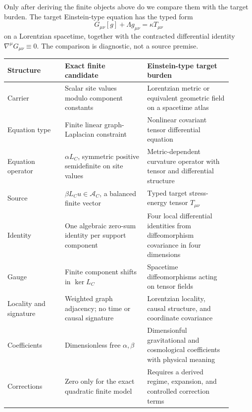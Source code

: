 \documentclass[11pt]{article}
\newcommand{\Aspace}{\mathcal A_C}
\begin{document}
Only after deriving the finite objects above do we compare them with the
target burden.  The target Einstein-type equation has the typed form
\[
 G_{\mu\nu}[g]+\Lambda g_{\mu\nu}=\kappa T_{\mu\nu}
\]
on a Lorentzian spacetime, together with the contracted differential
identity \(\nabla^\mu G_{\mu\nu}\equiv0\).  The comparison is diagnostic,
not a source premise.

\begin{longtable}{p{0.23\linewidth}p{0.33\linewidth}p{0.34\linewidth}}
\toprule
Structure & Exact finite candidate & Einstein-type target burden\\
\midrule
Carrier &
Scalar site values modulo component constants &
Lorentzian metric or equivalent geometric field on a spacetime atlas\\
Equation type &
Finite linear graph-Laplacian constraint &
Nonlinear covariant tensor differential equation\\
Equation operator &
\(\alpha L_C\), symmetric positive semidefinite on site values &
Metric-dependent curvature operator with tensor and differential structure\\
Source &
\(\beta L_Cu\in\Aspace\), a balanced finite vector &
Typed target stress-energy tensor \(T_{\mu\nu}\)\\
Identity &
One algebraic zero-sum identity per support component &
Four local differential identities from diffeomorphism covariance in four
dimensions\\
Gauge &
Finite component shifts in \(\ker L_C\) &
Spacetime diffeomorphisms acting on tensor fields\\
Locality and signature &
Weighted graph adjacency; no time or causal signature &
Lorentzian locality, causal structure, and coordinate covariance\\
Coefficients &
Dimensionless free \(\alpha,\beta\) &
Dimensionful gravitational and cosmological coefficients with physical
meaning\\
Corrections &
Zero only for the exact quadratic finite model &
Requires a derived regime, expansion, and controlled correction terms\\
\bottomrule
\end{longtable}
\end{document}
